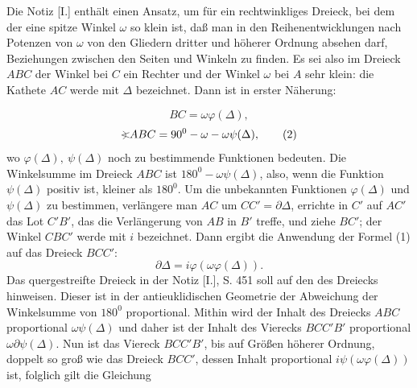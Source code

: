 \indent Die Notiz [I.] enthält einen Ansatz, um für ein rechtwinkliges Dreieck, bei dem der eine spitze Winkel \(\omega\) so klein ist, daß man in den Reihenentwicklungen nach Potenzen von \(\omega\) von den Gliedern dritter und höherer Ordnung absehen darf, Beziehungen zwischen den Seiten und Winkeln zu finden. Es sei also im Dreieck \(ABC\) der Winkel bei \(C\) ein Rechter und der Winkel \(\omega\) bei \(A\) sehr klein: die Kathete \(AC\) werde mit \(\Delta\) bezeichnet. Dann ist in erster Näherung:
\begin{center}
\end{center}
\begin{equation}BC=\omega\varphi(\Delta),\tag{1}\end{equation}
\begin{equation}\GeomAngle ABC=90^{0}-\omega-\omega\psi(\Delta),\tag{2}\end{equation}
\noindent wo \(\varphi(\Delta),\ \psi(\Delta)\) noch zu bestimmende Funktionen bedeuten. Die Winkelsumme im Dreieck \(ABC\) ist \(180^{0}-\omega\psi(\Delta)\), also, wenn die Funktion \(\psi(\Delta)\) positiv ist, kleiner als \(180^{0}\). Um die unbekannten Funktionen \(\varphi(\Delta)\) und \(\psi(\Delta)\) zu bestimmen, verlängere man \(AC\) um \(CC'=\partial\Delta\), errichte in \(C'\) auf \(AC'\) das Lot \(C'B'\), das die Verlängerung von \(AB\) in \(B'\) treffe, und ziehe \(BC'\); der Winkel \(CBC'\) werde mit \(i\) bezeichnet. Dann ergibt die Anwendung der Formel (1) auf das Dreieck \(BCC'\):
\begin{equation}\partial\Delta=i\varphi(\omega\varphi(\Delta)).\tag{3}\end{equation}
\noindent Das quergestreifte Dreieck in der Notiz [I.], S. 451 soll auf den  des Dreiecks hinweisen. Dieser ist in der antieuklidischen Geometrie der Abweichung der Winkelsumme von \(180^{0}\) proportional. Mithin wird der Inhalt des Dreiecks \(ABC\) proportional \(\omega\psi(\Delta)\) und daher ist der Inhalt des Vierecks \(BCC'B'\) proportional \(\omega\partial\psi(\Delta)\). Nun ist das Viereck \(BCC'B'\), bis auf Größen höherer Ordnung, doppelt so groß wie das Dreieck \(BCC'\), dessen Inhalt proportional \(i\psi(\omega\varphi(\Delta))\) ist, folglich gilt die Gleichung
